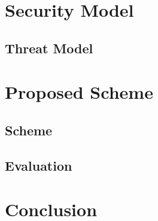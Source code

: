 \section{Security Model}

\subsection{Threat Model}

\section{Proposed Scheme}

\subsection{Scheme}

\subsection{Evaluation}

\section{Conclusion}

